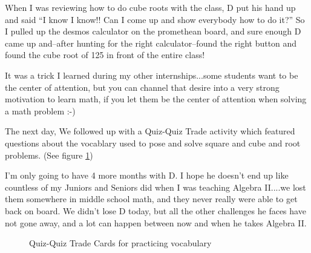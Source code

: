 \documentclass[11pt]{elegantbook}
\begin{document}
When I was reviewing how to do cube roots with the class, D put his
hand up and said ``I know I know!!  Can I come up and show everybody
how to do it?''  So I pulled up the desmos calculator on the
promethean board, and sure enough D came up and--after hunting for the
right calculator--found the right button and found the cube root of
125 in front of the entire class!

It was a trick I learned during my other internships...some students
want to be the center of attention, but you can channel that desire
into a very strong motivation to learn math, if you let them be the
center of attention when solving a math problem :-)

The next day, We followed up with a Quiz-Quiz Trade activity
which featured questions about the vocablary used to pose and solve
square and cube and root problems. (See figure \ref{qqt_root})

I'm only going to have 4 more months with D.  I hope he doesn't end up
like countless of my Juniors and Seniors did when I was teaching
Algebra II....we lost them somewhere in middle school math, and they
never really were able to get back on board.  We didn't lose D today,
but all the other challenges he faces have not gone away, and a lot
can happen between now and when he takes Algebra II.










\begin{figure}[h]
  \begin{minipage}[t]{5in}
    
    \caption{Quiz-Quiz Trade Cards for practicing vocabulary}
  \end{minipage}
  \label{qqt_root}
\end{figure}


\end{document}
